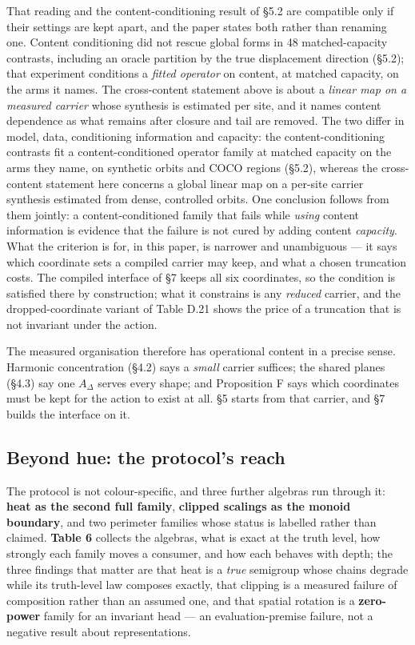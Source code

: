 That reading and the content-conditioning result of \S{}5.2 are compatible only if their settings are kept apart, and the paper states both rather than renaming one. Content conditioning did not rescue global forms in 48 matched-capacity contrasts, including an oracle partition by the true displacement direction (\S{}5.2); that experiment conditions a \textit{fitted operator} on content, at matched capacity, on the arms it names. The cross-content statement above is about a \textit{linear map on a measured carrier} whose synthesis is estimated per site, and it names content dependence as what remains after closure and tail are removed. The two differ in model, data, conditioning information and capacity: the content-conditioning contrasts fit a content-conditioned operator family at matched capacity on the arms they name, on synthetic orbits and COCO regions (\S{}5.2), whereas the cross-content statement here concerns a global linear map on a per-site carrier synthesis estimated from dense, controlled orbits. One conclusion follows from them jointly: a content-conditioned family that fails while \textit{using} content information is evidence that the failure is not cured by adding content \textit{capacity}. What the criterion is for, in this paper, is narrower and unambiguous --- it says which coordinate sets a compiled carrier may keep, and what a chosen truncation costs. The compiled interface of \S{}7 keeps all six coordinates, so the condition is satisfied there by construction; what it constrains is any \textit{reduced} carrier, and the dropped-coordinate variant of Table D.21 shows the price of a truncation that is not invariant under the action.

The measured organisation therefore has operational content in a precise sense. Harmonic concentration (\S{}4.2) says a \textit{small} carrier suffices; the shared planes (\S{}4.3) say one $A_\Delta$ serves every shape; and Proposition F says which coordinates must be kept for the action to exist at all. \S{}5 starts from that carrier, and \S{}7 builds the interface on it.

\subsection{Beyond hue: the protocol's reach}

The protocol is not colour-specific, and three further algebras run through it: \textbf{heat as the second full family}, \textbf{clipped scalings as the monoid boundary}, and two perimeter families whose status is labelled rather than claimed. \textbf{Table 6} collects the algebras, what is exact at the truth level, how strongly each family moves a consumer, and how each behaves with depth; the three findings that matter are that heat is a \textit{true} semigroup whose chains degrade while its truth-level law composes exactly, that clipping is a measured failure of composition rather than an assumed one, and that spatial rotation is a \textbf{zero-power} family for an invariant head --- an evaluation-premise failure, not a negative result about representations.


